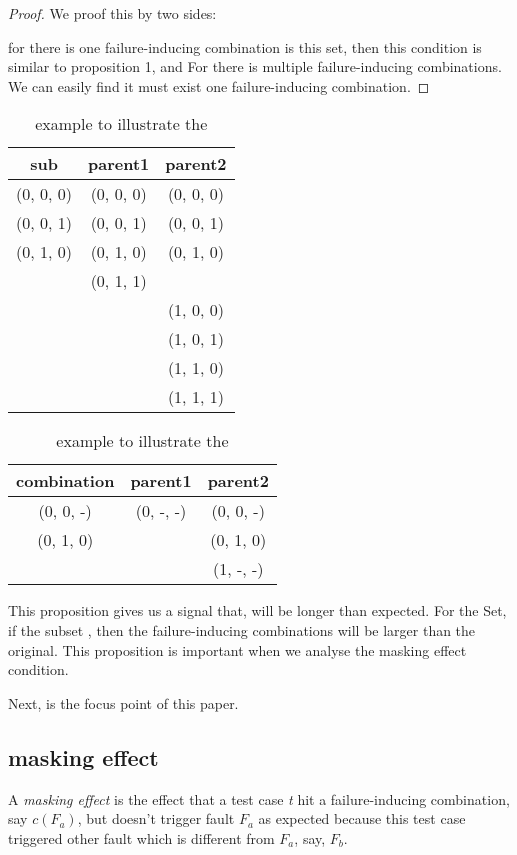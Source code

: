 \documentclass{sig-alternate}
\begin{document}
\begin{proof}
We proof this by two sides:

for there is one failure-inducing combination is this set, then this condition is similar to proposition 1, and For there is multiple failure-inducing combinations. We can easily find it must exist one failure-inducing combination.
\end{proof}

\begin{table}
\centering
\caption{example to illustrate the}
\label{example_three_condition}
\begin{tabular}{|c|c|c|} \hline
sub&parent1& parent2\\ \hline
(0, 0, 0)&(0, 0, 0) & (0, 0, 0)\\ \hline
(0, 0, 1)&(0, 0, 1) & (0, 0, 1)\\ \hline
(0, 1, 0)&(0, 1, 0) & (0, 1, 0)\\ \hline
         &(0, 1, 1) &       \\ \hline
		 & 			& (1, 0, 0)\\ \hline
		 & 			& (1, 0, 1)\\ \hline
		 & 			& (1, 1, 0)\\ \hline
		 &			& (1, 1, 1)\\ \hline
\hline\end{tabular}
\begin{tabular}{|c|c|c|} \hline
combination&parent1& parent2 \\ \hline
(0, 0, -)&(0, -, -) &  (0, 0, -)\\ \hline
(0, 1, 0)&		 	&  (0, 1, 0)\\ \hline
		 &		 	&  (1, -, -)\\ \hline
\hline\end{tabular}
\end{table}



This proposition gives us a signal that, will be longer than expected. For the Set, if the subset , then the failure-inducing combinations will be larger than the original. This proposition is important when we analyse the masking effect condition.

Next, is the focus point of this paper.

\subsection{masking effect}

\begin{definition}
A \emph{masking effect} is the effect that a test case \emph{t} hit a failure-inducing combination, say $c(F_{a})$, but doesn't trigger fault $F_{a}$ as expected because this test case triggered other fault which is different from $F_{a}$, say, $F_{b}$.

\end{definition}
\end{document}
